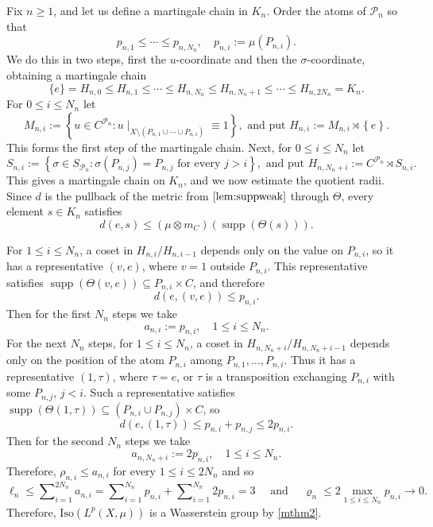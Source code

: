 \documentclass{amsart}
\numberwithin{equation}{subsection}
\theoremstyle{plain}
\theoremstyle{definition}
\theoremstyle{plain}
\begin{document}
Fix \(n\geq 1\), and let us define a martingale chain in \(K_{n}\). Order the atoms of \(\mathcal{P}_{n}\) so that
\[p_{n,1}\leq\dotsm\leq p_{n,N_{n}},\quad p_{n,i}:=\mu\left(P_{n,i}\right).\]
We do this in two steps, first the \(u\)-coordinate and then the \(\sigma\)-coordinate, obtaining a martingale chain
\[\{e\}=H_{n,0}\leq H_{n,1}\leq\dotsm\leq H_{n,N_{n}}\leq H_{n,N_{n}+1}\leq\dotsm\leq H_{n,2N_{n}}=K_{n}.\]
For \(0\leq i\leq N_{n}\) let
\[M_{n,i}:=\left\{u\in C^{\mathcal{P}_{n}}:u\mid_{X\setminus\left(P_{n,1}\cup\dotsm\cup P_{n,i}\right)}\equiv 1\right\},\text{ and put } H_{n,i}:=M_{n,i}\rtimes\left\{e\right\}.\]
This forms the first step of the martingale chain. Next, for \(0\leq i\leq N_{n}\) let
\[S_{n,i}:=\left\{\sigma\in S_{\mathcal{P}_{n}}:\sigma\left(P_{n,j}\right)=P_{n,j}\text{ for every }j>i\right\},\text{ and put }H_{n,N_{n}+i}:=C^{\mathcal{P}_{n}}\rtimes S_{n,i}.\]
This gives a martingale chain on \(K_{n}\), and we now estimate the quotient radii. Since \(d\) is the pullback of the metric from \(\cref{lem:suppweak}\) through \(\Theta\), every element \(s\in K_{n}\) satisfies
\[d\left(e,s\right)\leq\left(\mu\otimes m_{C}\right)\left(\operatorname{supp}\left(\Theta\left(s\right)\right)\right).\]

\smallskip

For \(1\leq i\leq N_{n}\), a coset in \(H_{n,i}/H_{n,i-1}\) depends only on the value on \(P_{n,i}\), so it has a representative \(\left(v,e\right)\), where \(v=1\) outside \(P_{n,i}\). This representative satisfies \(\operatorname{supp}\left(\Theta\left(v,e\right)\right)\subseteq P_{n,i}\times C\), and therefore
\[d\left(e,\left(v,e\right)\right)\leq p_{n,i}.\]
Then for the first \(N_{n}\) steps we take
\[a_{n,i}:=p_{n,i},\quad 1\leq i\leq N_{n}.\]
For the next \(N_{n}\) steps, for \(1\leq i\leq N_{n}\), a coset in
\(H_{n,N_{n}+i}/H_{n,N_{n}+i-1}\) depends only on the position of the atom \(P_{n,i}\) among
\(P_{n,1},\dotsc,P_{n,i}\). Thus it has a representative \(\left(1,\tau\right)\), where \(\tau=e\), or \(\tau\) is a transposition exchanging \(P_{n,i}\) with some \(P_{n,j}\), \(j<i\). Such a representative satisfies \(\operatorname{supp}\left(\Theta\left(1,\tau\right)\right)\subseteq\left(P_{n,i}\cup P_{n,j}\right)\times C\), so
\[d\left(e,\left(1,\tau\right)\right)\leq p_{n,i}+p_{n,j}\leq2p_{n,i}.\]
Then for the second \(N_{n}\) steps we take
\[a_{n,N_{n}+i}:=2p_{n,i},\quad 1\leq i\leq N_{n}.\]
Therefore, \(\rho_{n,i}\leq a_{n,i}\) for every \(1\leq i\leq2N_{n}\) and so
\[\ell_{n}\leq\sum\nolimits_{i=1}^{2N_{n}}a_{n,i}
=\sum\nolimits_{i=1}^{N_{n}}p_{n,i}+\sum\nolimits_{i=1}^{N_{n}}2p_{n,i}=3\quad\text{ and }\quad\varrho_{n}\leq2\max_{1\leq i\leq N_{n}}p_{n,i}\to0.\]
Therefore, \(\mathrm{Iso}\left(L^{p}\left(X,\mu\right)\right)\) is a Wasserstein group by \cref{mthm2}.
\end{document}
